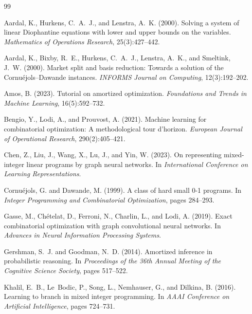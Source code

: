 \documentclass[final,5p,times,twocolumn]{elsarticle}
\begin{document}
\begin{thebibliography}{99}

Aardal, K., Hurkens, C.~A.~J., and Lenstra, A.~K. (2000).
Solving a system of linear Diophantine equations with lower and upper bounds on the variables.
\emph{Mathematics of Operations Research}, 25(3):427--442.

Aardal, K., Bixby, R.~E., Hurkens, C.~A.~J., Lenstra, A.~K., and Smeltink, J.~W. (2000).
Market split and basis reduction: Towards a solution of the Cornu\'ejols--Dawande instances.
\emph{INFORMS Journal on Computing}, 12(3):192--202.

Amos, B. (2023).
Tutorial on amortized optimization.
\emph{Foundations and Trends in Machine Learning}, 16(5):592--732.

Bengio, Y., Lodi, A., and Prouvost, A. (2021).
Machine learning for combinatorial optimization: A methodological tour d'horizon.
\emph{European Journal of Operational Research}, 290(2):405--421.

Chen, Z., Liu, J., Wang, X., Lu, J., and Yin, W. (2023).
On representing mixed-integer linear programs by graph neural networks.
In \emph{International Conference on Learning Representations}.

Cornu\'ejols, G. and Dawande, M. (1999).
A class of hard small 0-1 programs.
In \emph{Integer Programming and Combinatorial Optimization}, pages 284--293.

Gasse, M., Ch\'etelat, D., Ferroni, N., Charlin, L., and Lodi, A. (2019).
Exact combinatorial optimization with graph convolutional neural networks.
In \emph{Advances in Neural Information Processing Systems}.

Gershman, S.~J. and Goodman, N.~D. (2014).
Amortized inference in probabilistic reasoning.
In \emph{Proceedings of the 36th Annual Meeting of the Cognitive Science Society}, pages 517--522.

Khalil, E.~B., Le~Bodic, P., Song, L., Nemhauser, G., and Dilkina, B. (2016).
Learning to branch in mixed integer programming.
In \emph{AAAI Conference on Artificial Intelligence}, pages 724--731.


\end{thebibliography}
\end{document}
